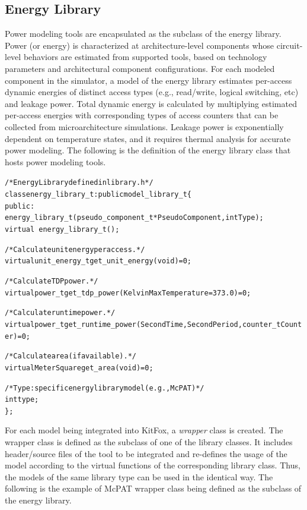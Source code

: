 \subsection{Energy Library} \label{subsec:energy_library}
\noindent
Power modeling tools are encapsulated as the subclass of the energy library. 
Power (or energy) is characterized at architecture-level components whose circuit-level behaviors are estimated from supported tools, based on technology parameters and architectural component configurations.
For each modeled component in the simulator, a model of the energy library estimates per-access dynamic energies of distinct access types (e.g., read/write, logical switching, etc) and leakage power.
Total dynamic energy is calculated by multiplying estimated per-access energies with corresponding types of access counters that can be collected from microarchitecture simulations.
Leakage power is exponentially dependent on temperature states, and it requires thermal analysis for accurate power modeling.
The following is the definition of the energy library class that hosts power modeling tools.

{
\fontsize{10pt}{11pt}\selectfont
\begin{alltt}
/* Energy Library defined in library.h */
class energy_library_t : public model_library_t \{
public:
    energy_library_t(pseudo_component_t *PseudoComponent, int Type);
    virtual ~energy_library_t();

    /* Calculate unit energy per access. */
    virtual unit_energy_t get_unit_energy(void)=0;

    /* Calculate TDP power. */
    virtual power_t get_tdp_power(Kelvin MaxTemperature=373.0)=0;

    /* Calculate runtime power. */
    virtual power_t get_runtime_power(Second Time, Second Period, counter_t Counter)=0;

    /* Calculate area (if available). */
    virtual MeterSquare get_area(void)=0;

    /* Type: specific energy library model (e.g., McPAT) */
    int type;
\};
\end{alltt}
}

\noindent
For each model being integrated into KitFox, a \emph{wrapper} class is created. 
The wrapper class is defined as the subclass of one of the library classes.
It includes header/source files of the tool to be integrated and re-defines the usage of the model according to the virtual functions of the corresponding library class.
Thus, the models of the same library type can be used in the identical way.
The following is the example of McPAT wrapper class being defined as the subclass of the energy library.

